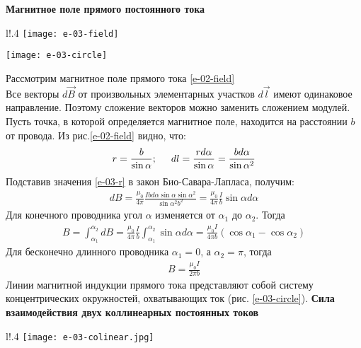 \documentclass[__main__.tex]{subfiles}
\begin{document}
\textbf{Магнитное поле прямого постоянного тока}\\
\begin{wrapfigure}{l!}{.4\linewidth}
	\texttt{[image: e-03-field]}
	\caption{Магнитное поле прямого тока}
	\label{e-03-field}
	\texttt{[image: e-03-circle]}
	\caption{Силовые линии}
	\label{e-03-circle}
\end{wrapfigure}
Рассмотрим магнитное поле прямого тока	\ref{e-02-field}\\
Все векторы $d\vec{B}$ от произвольных элементарных участков $d\vec{l}$ имеют одинаковое направление. Поэтому сложение векторов можно заменить сложением модулей.\\
Пусть точка, в которой определяется магнитное поле, находится на расстоянии $b$ от провода. Из рис.\ref{e-02-field} видно, что:
\begin{gather}
	r = \frac{b}{\sin{\alpha}}; \hspace{0.5cm} dl = \frac{rd\alpha}{\sin{\alpha}} = \frac{bd\alpha}{\sin{\alpha}^2}
	\label{e-03-r}
\end{gather}
Подставив значения \ref{e-03-r} в закон Био-Савара-Лапласа, получим:
\begin{gather*}
	dB = \frac{\mu_0}{4\pi}\frac{Ibd\alpha\sin{\alpha}\sin{\alpha}^2}{\sin{\alpha}^2b^2} = \frac{\mu_0}{4\pi}\frac{I}{b}\sin{\alpha}d\alpha
\end{gather*}
Для конечного проводника угол $\alpha$ изменяется от $\alpha_1$ до $\alpha_2$. Тогда 
\begin{gather*}
	B = \int_{\alpha_1}^{\alpha_2}{dB} = \frac{\mu_0}{4\pi}\frac{I}{b} \int_{\alpha_1}^{\alpha_2}{\sin{\alpha}d\alpha} = \frac{\mu_0I}{4\pi b}(\cos{\alpha_1} - \cos{\alpha_2})
\end{gather*}
Для бесконечно длинного проводника $\alpha_1 = 0$, а $\alpha_2 = \pi$, тогда
\begin{gather*}
	B = \frac{\mu_0I}{2\pi b}
\end{gather*}
Линии магнитной индукции прямого тока представляют собой систему концентрических окружностей, охватывающих ток (рис. \ref{e-03-circle}).
\newpage
\textbf{Сила взаимодействия двух коллинеарных постоянных токов}\\

\begin{wrapfigure}{l!}{.4\linewidth}
	\texttt{[image: e-03-colinear.jpg]}
	\caption{Параллельные токи}
	\label{e-03-colinear}
\end{wrapfigure}
\end{document}

